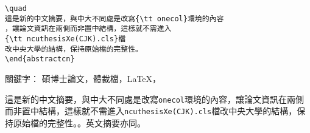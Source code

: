 \begin{appendB}
\begin{Verbatim}[frame=single,firstline=1,lastline=50,rulecolor=\color{red},label=New abstract]
\quad
這是新的中文摘要，與中大不同處是改寫{\tt onecol}環境的內容
，讓論文資訊在兩側而非置中結構，這樣就不需進入
{\tt ncuthesisXe(CJK).cls}檔
改中央大學的結構，保持原始檔的完整性。
\end{abstractcn}
\end{Verbatim}      




\makeatletter
\renewenvironment{onecol}[1]
{\cleardoublepage\phantomsection
\addcontentsline{toc}{subsection}{#1} %
\begin{alwayssingle}
\thispagestyle{plain}
\begin{center}
{\Huge \bfseries #1}
\end{center}
\setlength{\parindent}{0pt}
{\Large 校所系別：\@dept \par \vspace*{1ex}}
{\Large 畢業日期：\@degreedate \hfill 學位：\@degree \par \vspace*{1ex}}
{\Large 研究生：\@author \hfill 指導教授：\@mprof \par \vspace*{2ex}}
}
{\null \vfill
\end{alwayssingle}}
\makeatother

\begin{abstractcn}
關鍵字： 碩博士論文，體裁檔，\LaTeX，\XeLaTeX
\vspace{2ex}

\quad

這是新的中文摘要，與中大不同處是改寫{\tt onecol}環境的內容，讓論文資訊在兩側而非置中結構，這樣就不需進入{\tt ncuthesisXe(CJK).cls}檔改中央大學的結構，保持原始檔的完整性。。英文摘要亦同。


\end{abstractcn}
\end{appendB}
